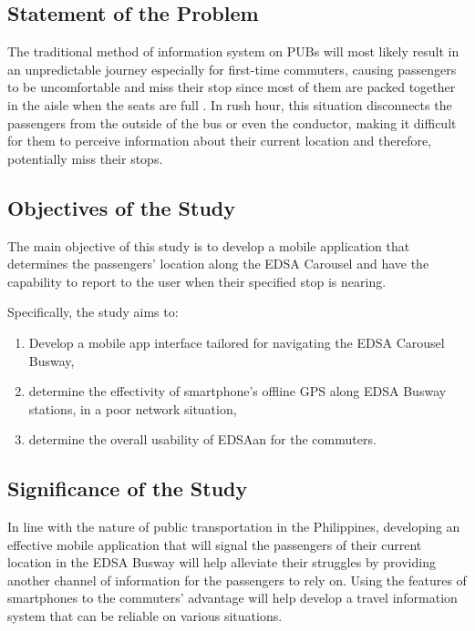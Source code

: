 \documentclass{icsthesis}
\begin{document}
\begin{mainmatter}
\subsection{Statement of the Problem}
The traditional method of information system on PUBs will most likely result in an unpredictable journey especially for first-time commuters, causing passengers to be uncomfortable and miss their stop since most of them are packed together in the aisle when the seats are full \citep{Ref:004}.
In rush hour, this situation disconnects the passengers from the outside of the bus or even the conductor, making it difficult for them to perceive information about their current location and therefore, potentially miss their stops.

\subsection{Objectives of the Study}
The main objective of this study is to develop a mobile application that determines the passengers’ location along the EDSA Carousel and have the capability to report to the user when their specified stop is nearing.

Specifically, the study aims to:
\begin{enumerate}
    \item Develop a mobile app interface tailored for navigating the EDSA Carousel Busway,
    \item determine the effectivity of smartphone’s offline GPS along EDSA Busway stations, in a poor network situation,
    \item determine the overall usability of EDSAan for the commuters.
\end{enumerate}

\newpage

\subsection{Significance of the Study}
In line with the nature of public transportation in the Philippines, developing an effective mobile application that will signal the passengers of their current location in the EDSA Busway will help alleviate their struggles by providing another channel of information for the passengers to rely on. Using the features of smartphones to the commuters’ advantage will help develop a travel information system that can be reliable on various situations. 



\end{mainmatter}
\end{document}
